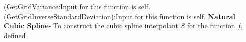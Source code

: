 \begin{enumerate}
  (GetGridVariance:Input for this function is self.
  (GetGridInverseStandardDeviation):Input for this function is self.
 {\bf Natural Cubic Spline}- To construct the cubic spline interpolant $S$ for the function $f$, defined

\end{enumerate}
